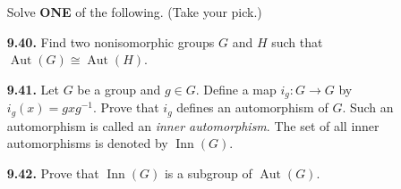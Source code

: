 \documentclass[12pt,reqno]{amsart}
\newcommand{\aut}{\ensuremath{\operatorname{Aut}}}
\newcommand{\inn}{\ensuremath{\operatorname{Inn}}}
\newcommand{\<}{\ensuremath{\langle}}
\renewcommand{\>}{\ensuremath{\rangle}}
\newcommand{\boldemph}{\emph}
\begin{document}
\begin{enumerate}[{\bf 1.}]
\vfill

\noindent Solve {\bf ONE} of the following. (Take your pick.)

% 
 

\bigskip %

% 

\item[{\bf 9.40.}]
Find two nonisomorphic groups $G$ and $H$ such that $\aut(G) \cong \aut(
H)$. 
 
\bigskip %

\item[{\bf 9.41.}]
Let $G$ be a group and $g \in G$. Define a map $i_g : G \rightarrow
G$\label{noteinner} 
by $i_g(x) = g x g^{-1}$.  Prove that $i_g$ defines an automorphism of
$G$.  Such an automorphism is called an \boldemph{inner
automorphism}. The set of all inner
automorphisms is denoted by $\inn(G)$\label{noteinneraut}. 

\bigskip %
 

\item[{\bf 9.42.}]
Prove that $\inn(G)$ is a subgroup of $\aut(G)$.
 
 
\end{enumerate}
\end{document}
